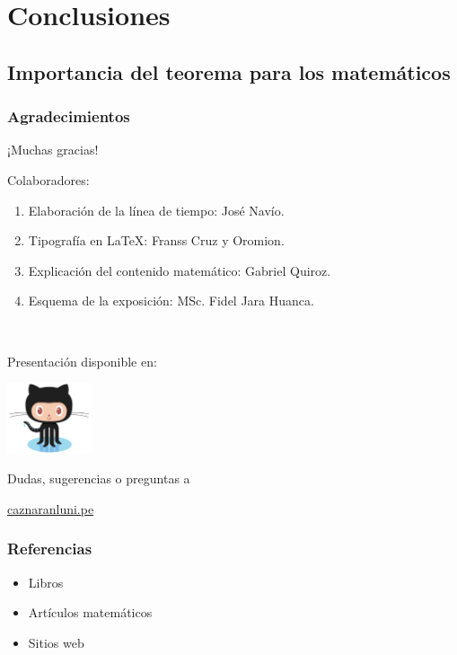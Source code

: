 \documentclass[spanish, utf8,handout]{beamer} %
\theoremstyle{definition}
\begin{document}
\section{Conclusiones}

\subsection{Importancia del teorema para los matemáticos}

\begin{frame}
\frametitle{Agradecimientos}

\begin{center}\Large
	¡Muchas gracias!
\end{center}

Colaboradores:

\begin{enumerate}
	\item Elaboración de la línea de tiempo: José Navío.
	\item Tipografía en \LaTeX{}: Franss Cruz y Oromion.
	\item Explicación del contenido matemático: Gabriel Quiroz.
	\item Esquema de la exposición: MSc. Fidel Jara Huanca.
\end{enumerate}

\

{
\color{DarkBlue}
Presentación disponible en:
}
\begin{center}
\href{https://github.com/carlosal1015/4colores}{\includegraphics[width=2.5cm]{Octocat.png}}
\end{center}
\hfill
\begin{flushright}
Dudas, sugerencias o preguntas a

\href{mailto:caznaranl@uni.pe}{caznaranl\MVAt uni.pe}
\end{flushright}
\end{frame}

\begin{frame}[allowframebreaks]\transblindsvertical
\frametitle{Referencias}

\begin{itemize}
	\item Libros
	\nocite{*}
	\printbibliography[heading=none,keyword=book]
	
	\item Artículos matemáticos
	\printbibliography[heading=none,keyword=paper]
	
	\item Sitios web
	\printbibliography[heading=none,keyword=online]
\end{itemize}
\end{frame}
\end{document}
